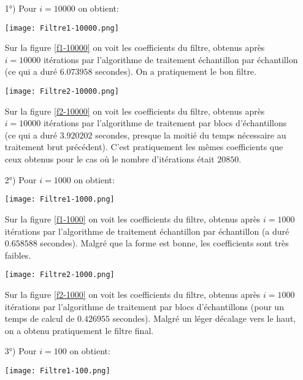 \begin{itemize}
\item[1°)] Pour $ i=10000 $ on obtient:
\begin{center}
\texttt{[image: Filtre1-10000.png]}
\label{f1-10000}
\end{center}
Sur la figure \ref{f1-10000} on voit les coefficients du filtre, obtenus après $ i=10000 $ itérations par l'algorithme de traitement échantillon par échantillon (ce qui a duré $ 6.073958 $ secondes). On a pratiquement le bon filtre.
\begin{center}
\texttt{[image: Filtre2-10000.png]}
\label{f2-10000}
\end{center}
Sur la figure \ref{f2-10000} on voit les coefficients du filtre, obtenus après $ i=10000 $ itérations par l'algorithme de traitement par blocs d'échantillons (ce qui a duré $ 3.920202 $ secondes, presque la moitié du temps nécessaire au traitement brut précédent).  C'est pratiquement les mêmes coefficients que ceux obtenus pour le cas où le nombre d'itérations était $ 20850 $.
\item[2°)] Pour $ i=1000 $ on obtient:
\begin{center}
\texttt{[image: Filtre1-1000.png]}
\label{f1-1000}
\end{center}
Sur la figure \ref{f1-1000} on voit les coefficients du filtre, obtenus après $ i=1000 $ itérations par l'algorithme de traitement échantillon par échantillon (a duré $ 0.658588 $ secondes). Malgré que la forme est bonne, les coefficients sont très faibles.
\begin{center}
\texttt{[image: Filtre2-1000.png]}
\label{f2-1000}
\end{center}
Sur la figure \ref{f2-1000} on voit les coefficients du filtre, obtenus après $ i=1000 $ itérations par l'algorithme de traitement par blocs d'échantillons (pour un temps de calcul de $ 0.426955 $ secondes).  Malgré un léger décalage vers le haut, on a obtenu pratiquement le filtre final.
\item[3°)] Pour $ i=100 $ on obtient:
\begin{center}
\texttt{[image: Filtre1-100.png]}
\label{f1-100}
\end{center}

\end{itemize}
